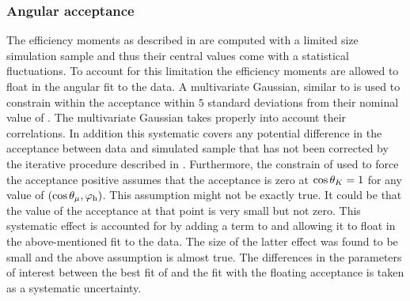 \subsubsection{Angular acceptance}
\label{systAngAcc}
The efficiency moments as described in  are computed with a limited size simulation sample
and thus their central values come with a statistical fluctuations. To account for this limitation the
efficiency moments are allowed to float in the angular fit to the data. A multivariate Gaussian, similar to 
is used to constrain within the acceptance within $5$ standard deviations from their nominal value of .
The multivariate Gaussian takes properly into account their correlations. In addition this systematic covers any
potential difference in the acceptance between data and simulated sample
that has not been corrected by the iterative procedure described in . Furthermore,
the constrain of  used to force the acceptance positive assumes that the acceptance is zero
at $\cos\theta_{K}=1$ for any value of $(\cos\theta_{\mu},\varphi_{\text h})$. This assumption might not be exactly true. It could be
that the value of the acceptance at that point is very small but not zero. This systematic effect is accounted for
by adding a term to  and allowing it to float in the above-mentioned fit to the data.
The size of the latter effect was found to be small and the above assumption is almost true. The differences
in the parameters of interest between the best fit of  and the fit with the floating acceptance
is taken as a systematic uncertainty.


